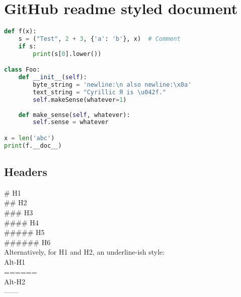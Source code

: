 

\pagestyle{plain}  %

\setcounter{secnumdepth}{0}  %



\section{GitHub readme styled document}

\begin{lstlisting}[language=Python]
def f(x):
	s = ("Test", 2 + 3, {'a': 'b'}, x)  # Comment
	if s:
		print(s[0].lower())

class Foo:
	def __init__(self):
		byte_string = 'newline:\n also newline:\x0a'
		text_string = "Cyrillic Я is \u042f."
		self.makeSense(whatever=1)
	
	def make_sense(self, whatever):
		self.sense = whatever

x = len('abc')
print(f.__doc__)
\end{lstlisting}

\subsection{Headers}

\begin{mdframed}
\# H1 \\
\#\# H2 \\
\#\#\# H3 \\
\#\#\#\# H4 \\
\#\#\#\#\# H5 \\
\#\#\#\#\#\# H6 \\

Alternatively, for H1 and H2, an underline-ish style: \\

Alt-H1 \\
====== \\

Alt-H2 \\
------
\end{mdframed}


